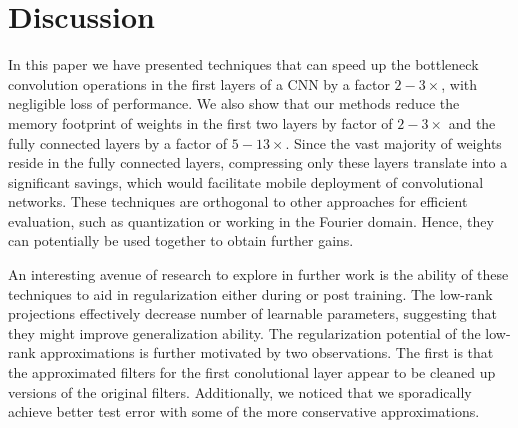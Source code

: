 \section{Discussion}
In this paper we have presented techniques that can speed up the
bottleneck convolution operations in the first layers of a CNN by a factor $2-3\times$, with negligible loss of performance.
We also show that our methods reduce the memory footprint of weights
in the first two layers by factor of $2-3\times$ and the fully connected layers by a factor of $5-13\times$.
Since the vast majority of weights reside in the fully connected layers, compressing only these layers 
translate into a significant savings, which would facilitate mobile deployment
of convolutional networks.  
These techniques are orthogonal
to other approaches for efficient evaluation, such as quantization or
working in the Fourier domain. Hence, they can potentially be used
together to obtain further gains. 

An interesting avenue of research to explore in further work is the ability of these techniques to aid in regularization either during or post training.
The low-rank projections effectively decrease number of learnable parameters,
suggesting that they might improve generalization ability.
The regularization potential of the low-rank approximations is further motivated by two observations. 
The first is that the approximated filters for the first conolutional layer appear to be cleaned up versions of the original filters. 
Additionally, we noticed that we sporadically achieve better
test error with some of the more conservative approximations. 




